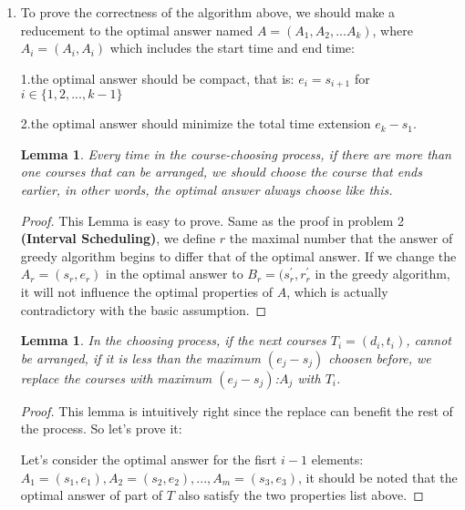 \documentclass[12pt,a4paper]{article}
\makeatletter
\newtheorem{lemma}[theorem]{Lemma}
\newtheorem*{solution}{Solution}
\theoremstyle{definition}
\renewenvironment{solution}[1][Solution] {\par\pushQED{\qed}\normalfont\topsep6\p@\@plus6\p@\relax\trivlist\item[\hskip\labelsep\bfseries#1\@addpunct{.}]\ignorespaces}{\popQED\endtrivlist\@endpefalse} \makeatother
\makeatother
\begin{document}
\begin{enumerate}
\begin{minipage}[t]{0.80\textwidth}
\begin{algorithm}[H]
{           
       }
       
   \end{algorithm}
\end{minipage}

    \begin{solution}
      To prove the correctness of the algorithm above, we should make a reducement to the optimal answer named $A = (A_1, A_2, ...A_k)$, where $A_i=(A_i, A_i)$ which includes the start time and end time:


      1.the optimal answer should be compact, that is: $e_i = s_{i+1}$ for $i\in\{1, 2, ..., k-1\}$ 

      2.the optimal answer should minimize the total time extension $e_{k} - s_1$.
      
      \begin{lemma}
          Every time in the course-choosing process, if there are more than one courses that can be arranged, we should choose the course that ends earlier, in other words, the optimal answer always choose like this.         
      \end{lemma}

      \begin{proof}
           This Lemma is easy to prove. Same as the proof in problem 2 \textbf{(Interval Scheduling)}, we define $r$ the maximal number that the answer of greedy algorithm begins to differ that of the optimal answer. If we change the $A_r=(s_r, e_r)$ in the optimal answer to $B_r=(s_r^{'}, r_r^{'}$ in the greedy algorithm, it will not influence the optimal properties of $A$, which is actually contradictory with the basic assumption. 
      \end{proof}
      
      \begin{lemma}
          In the choosing process, if the next courses $T_i = (d_i, t_i)$, cannot be arranged, if it is less than the maximum $(e_j - s_j)$ choosen before, we replace the courses with maximum $(e_j - s_j)$:$A_j$ with $T_i$.
      \end{lemma}

      \begin{proof}
         This lemma is intuitively right since the replace can benefit the rest of the process. So let's prove it:

         Let's consider the optimal answer for the fisrt $i-1$ elements: $A_1=(s_1, e_1), A_2=(s_2, e_2), ..., A_m=(s_3, e_3)$, it should be noted that the optimal answer of part of $T$ also satisfy the two properties list above.


\end{proof}
\end{solution}
\end{enumerate}
\end{document}
